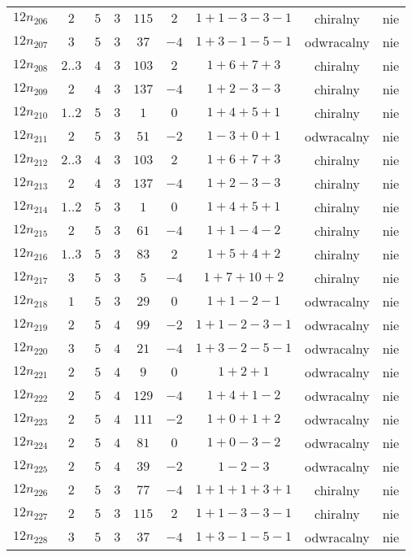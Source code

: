 \begin{longtable}{ccccccccc}
$12n_{206}$ & $2$ & $5$ & $3$ & $115$ & $2$ & $1+1-3-3-1$ & chiralny & nie \\
$12n_{207}$ & $3$ & $5$ & $3$ & $37$ & $-4$ & $1+3-1-5-1$ & odwracalny & nie \\
$12n_{208}$ & $2..3$ & $4$ & $3$ & $103$ & $2$ & $1+6+7+3$ & chiralny & nie \\
$12n_{209}$ & $2$ & $4$ & $3$ & $137$ & $-4$ & $1+2-3-3$ & chiralny & nie \\
$12n_{210}$ & $1..2$ & $5$ & $3$ & $1$ & $0$ & $1+4+5+1$ & chiralny & nie \\
$12n_{211}$ & $2$ & $5$ & $3$ & $51$ & $-2$ & $1-3+0+1$ & odwracalny & nie \\
$12n_{212}$ & $2..3$ & $4$ & $3$ & $103$ & $2$ & $1+6+7+3$ & chiralny & nie \\
$12n_{213}$ & $2$ & $4$ & $3$ & $137$ & $-4$ & $1+2-3-3$ & chiralny & nie \\
$12n_{214}$ & $1..2$ & $5$ & $3$ & $1$ & $0$ & $1+4+5+1$ & chiralny & nie \\
$12n_{215}$ & $2$ & $5$ & $3$ & $61$ & $-4$ & $1+1-4-2$ & chiralny & nie \\
$12n_{216}$ & $1..3$ & $5$ & $3$ & $83$ & $2$ & $1+5+4+2$ & chiralny & nie \\
$12n_{217}$ & $3$ & $5$ & $3$ & $5$ & $-4$ & $1+7+10+2$ & chiralny & nie \\
$12n_{218}$ & $1$ & $5$ & $3$ & $29$ & $0$ & $1+1-2-1$ & odwracalny & nie \\
$12n_{219}$ & $2$ & $5$ & $4$ & $99$ & $-2$ & $1+1-2-3-1$ & odwracalny & nie \\
$12n_{220}$ & $3$ & $5$ & $4$ & $21$ & $-4$ & $1+3-2-5-1$ & odwracalny & nie \\
$12n_{221}$ & $2$ & $5$ & $4$ & $9$ & $0$ & $1+2+1$ & odwracalny & nie \\
$12n_{222}$ & $2$ & $5$ & $4$ & $129$ & $-4$ & $1+4+1-2$ & odwracalny & nie \\
$12n_{223}$ & $2$ & $5$ & $4$ & $111$ & $-2$ & $1+0+1+2$ & odwracalny & nie \\
$12n_{224}$ & $2$ & $5$ & $4$ & $81$ & $0$ & $1+0-3-2$ & odwracalny & nie \\
$12n_{225}$ & $2$ & $5$ & $4$ & $39$ & $-2$ & $1-2-3$ & odwracalny & nie \\
$12n_{226}$ & $2$ & $5$ & $3$ & $77$ & $-4$ & $1+1+1+3+1$ & chiralny & nie \\
$12n_{227}$ & $2$ & $5$ & $3$ & $115$ & $2$ & $1+1-3-3-1$ & chiralny & nie \\
$12n_{228}$ & $3$ & $5$ & $3$ & $37$ & $-4$ & $1+3-1-5-1$ & odwracalny & nie \\

\end{longtable}
